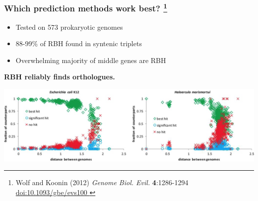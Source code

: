 \begin{frame}
  \frametitle{Which prediction methods work best?
    \footnote{\tiny{Wolf and Koonin (2012) \textit{Genome Biol. Evil.} \textbf{4}:1286-1294 \href{http://dx.doi.org/10.1093/gbe/evs100}{doi:10.1093/gbe/evs100
    }}}
  }
  \begin{itemize}
    \item Tested on 573 prokaryotic genomes
    \item 88-99\% of RBH found in syntenic triplets
    \item Overwhelming majority of middle genes are RBH
  \end{itemize}
  \textbf{RBH reliably finds orthologues.}
  \begin{center}
      \includegraphics[width=1\textwidth]{images/syntenic_triplet_results} 
  \end{center}
\end{frame}

